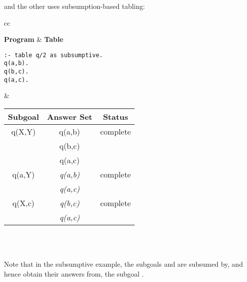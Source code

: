 \noindent
and the other uses subsumption-based tabling:

\begin{center}
\begin{tabular}{cc}\hline \hline
{} \\ \hline \hline
\rule[-2ex]{0ex}{5ex} \textbf{Program} & \textbf{Table} \\
\begin{minipage}{17em}
\begin{verbatim}
:- table q/2 as subsumptive.
q(a,b).
q(b,c).
q(a,c).
\end{verbatim}
\end{minipage}
&
\begin{tabular}{|c|c|c|} \hline
  Subgoal & Answer Set & Status \\ \hline \hline
  q(X,Y) & q(a,b) & complete \\
         & q(b,c) & \\
         & q(a,c) & \\ \hline
  q(a,Y) & \textit{q(a,b)} & complete \\
         & \textit{q(a,c)} & \\ \hline
  q(X,c) & \textit{q(b,c)} & complete \\
         & \textit{q(a,c)} & \\ \hline
\end{tabular} \\
\vspace*{-2ex} \\ \hline \hline
\end{tabular}
\end{center}

\noindent
Note that in the subsumptive example, the subgoals  and
 are subsumed by, and hence obtain their answers from,
the subgoal \@.

\vspace{2ex}

